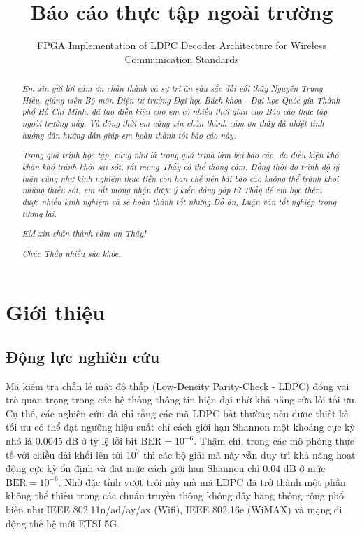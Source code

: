 \documentclass[12pt,a4paper,oneside]{book}
\title{Báo cáo thực tập ngoài trường} %
\subtitle{FPGA Implementation of LDPC Decoder Architecture for Wireless Communication Standards} %
\begin{document}
\coverpage

\frontmatter

\pagestyle{fancy}


\newpage
\begin{abstract}
\textit{Em xin gửi lời cảm ơn chân thành và sự tri ân sâu sắc đối với thầy Nguyễn Trung Hiếu, giảng viên Bộ môn Điện tử trường Đại học Bách khoa - Đại học Quốc gia Thành phố Hồ Chí Minh, đã tạo điều kiện cho em có nhiều thời gian cho Báo cáo thực tập ngoài trường này. Và đồng thời em cũng xin chân thành cảm ơn thầy đã nhiệt tình hướng dẫn hướng dẫn giúp em hoàn thành tốt báo cáo này.}

\textit{Trong quá trình học tập, cũng như là trong quá trình làm bài báo cáo, do điều kiện khó khăn khó tránh khỏi sai sót, rất mong Thầy có thể thông cảm. Đồng thời do trình độ lý luận cũng như kinh nghiệm thực tiễn còn hạn chế nên bài báo cáo không thể tránh khỏi những thiếu sót, em rất mong nhận được ý kiến đóng góp từ Thầy để em học thêm được nhiều kinh nghiệm và sẽ hoàn thành tốt những Đồ án, Luận văn tốt nghiệp trong tương lai.}

\textit{EM xin chân thành cảm ơn Thầy!}

\textit{Chúc Thầy nhiều sức khỏe.}

\end{abstract}

\tableofcontents
\listoffigures
\listoftables

\mainmatter


\chapter{Giới thiệu}
\section{Động lực nghiên cứu}
Mã kiểm tra chẵn lẻ mật độ thấp (Low-Density Parity-Check - LDPC) đóng vai trò quan trọng trong các hệ thống thông tin hiện đại nhờ khả năng sửa lỗi tối ưu. Cụ thể, các nghiên cứu \cite{1} đã chỉ rằng các mã LDPC bất thường nếu được thiết kế tối ưu có thể đạt ngưỡng hiệu suất chỉ cách giới hạn Shannon một khoảng cực kỳ nhỏ là $0.0045\text{ dB}$ ở tỷ lệ lỗi bit $\text{BER} = 10^{-6}$. Thậm chí, trong các mô phỏng thực tế với chiều dài khối lên tới $10^7$ thì các bộ giải mã này vẫn duy trì khả năng hoạt động cực kỳ ổn định và đạt mức cách giới hạn Shannon chỉ $0.04\text{ dB}$ ở mức $\text{BER} = 10^{-6}$. Nhờ đặc tính vượt trội này mà mã LDPC đã trở thành một phần không thể thiếu trong các chuẩn truyền thông không dây băng thông rộng phổ biến như IEEE 802.11n/ad/ay/ax (Wifi), IEEE 802.16e (WiMAX) và mạng di động thế hệ mới ETSI 5G.
\end{document}

